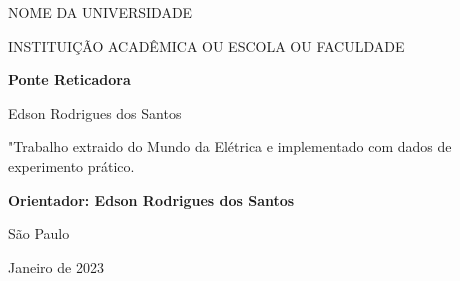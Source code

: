 \documentclass[a4paper,12pt]{article}
\begin{document}
\begin{titlepage}

\addtolength{\topmargin}{1.5cm}

\setlength{\baselineskip}{1.4\baselineskip}

\begin{center}
{\large{NOME DA UNIVERSIDADE}}

{\large{INSTITUIÇÃO ACADÊMICA OU ESCOLA OU FACULDADE}}

\end{center}
\vspace{2cm}
\begin{center}
{\Large\textbf{Ponte Reticadora}}
\end{center}

\vspace{1.5cm}

\begin{center}
{\Large{Edson Rodrigues dos Santos}}
\end{center}

\vspace{2cm}

\begin{flushright}

\begin{minipage}{10cm}

\hrulefill

"Trabalho extraido do Mundo da Elétrica e implementado com dados de experimento prático.

\hrulefill

{\textbf{Orientador: Edson Rodrigues dos Santos}}

\end{minipage}
\end{flushright}

\setlength{\baselineskip}{0.7\baselineskip}


\vfill

\begin{center}
São Paulo

Janeiro de 2023
\end{center}

\end{titlepage}
\end{document}

